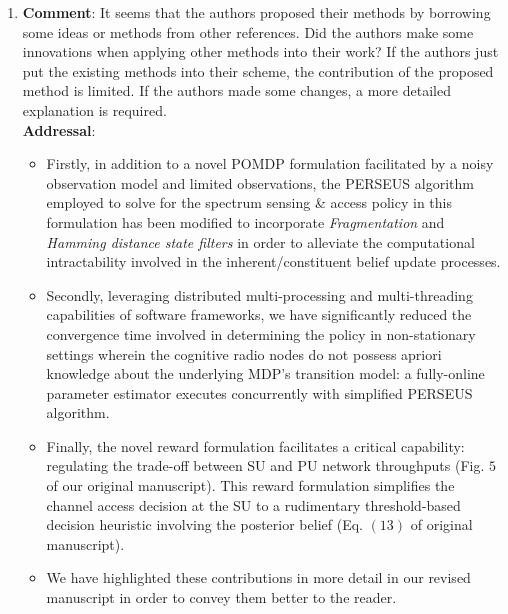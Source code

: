 \documentclass{article}
\begin{document}
\begin{enumerate}
    \item \textbf{Comment}: It seems that the authors proposed their methods by borrowing some ideas or methods from other references. Did the authors make some innovations when applying other methods into their work? If the authors just put the existing methods into their scheme, the contribution of the proposed method is limited. If the authors made some changes, a more detailed explanation is required.\\
    \textbf{Addressal}: 
    \begin{itemize}
        \item Firstly, in addition to a novel POMDP formulation facilitated by a noisy observation model and limited observations, the PERSEUS algorithm employed to solve for the spectrum sensing \& access policy in this formulation has been modified to incorporate \textit{Fragmentation} and \textit{Hamming distance state filters} in order to alleviate the computational intractability involved in the inherent/constituent belief update processes.
        \item Secondly, leveraging distributed multi-processing and multi-threading capabilities of software frameworks, we have significantly reduced the convergence time involved in determining the policy in non-stationary settings wherein the cognitive radio nodes do not possess apriori knowledge about the underlying MDP's transition model: a fully-online parameter estimator executes concurrently with simplified PERSEUS algorithm.
        \item Finally, the novel reward formulation facilitates a critical capability: regulating the trade-off between SU and PU network throughputs (Fig. $5$ of our original manuscript). This reward formulation simplifies the channel access decision at the SU to a rudimentary threshold-based decision heuristic involving the posterior belief (Eq. $(13)$ of original manuscript).
        \item We have highlighted these contributions in more detail in our revised manuscript in order to convey them better to the reader.
    \end{itemize}
    

\end{enumerate}
\end{document}
